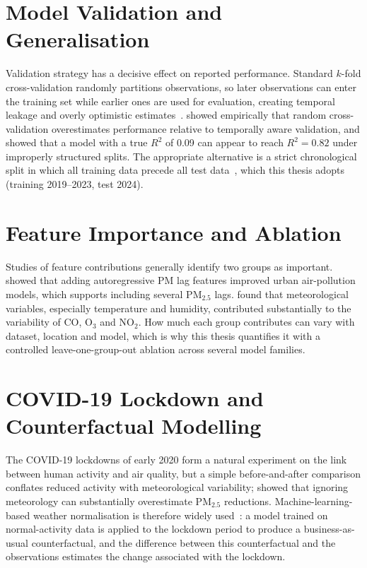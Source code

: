 \section{Model Validation and Generalisation}
Validation strategy has a decisive effect on reported performance. Standard $k$-fold cross-validation randomly partitions observations, so later observations can enter the training set while earlier ones are used for evaluation, creating temporal leakage and overly optimistic estimates~\parencite{mendez2023}. \textcite{xie2025} showed empirically that random cross-validation overestimates performance relative to temporally aware validation, and \textcite{boser2024} showed that a model with a true $R^2$ of 0.09 can appear to reach $R^2 = 0.82$ under improperly structured splits. The appropriate alternative is a strict chronological split in which all training data precede all test data~\parencite{bhatt2026}, which this thesis adopts (training 2019--2023, test 2024).

\section{Feature Importance and Ablation}
\label{sec:feature-importance}
Studies of feature contributions generally identify two groups as important. \textcite{zhalehdoost2025} showed that adding autoregressive PM lag features improved urban air-pollution models, which supports including several PM$_{2.5}$ lags. \textcite{rad2025} found that meteorological variables, especially temperature and humidity, contributed substantially to the variability of CO, O$_3$ and NO$_2$. How much each group contributes can vary with dataset, location and model, which is why this thesis quantifies it with a controlled leave-one-group-out ablation across several model families.

\section{COVID-19 Lockdown and Counterfactual Modelling}
\label{section:COVID-19 Lockdown and Counterfactual Modelling}
The COVID-19 lockdowns of early 2020 form a natural experiment on the link between human activity and air quality, but a simple before-and-after comparison conflates reduced activity with meteorological variability; \textcite{lv2022} showed that ignoring meteorology can substantially overestimate PM$_{2.5}$ reductions. Machine-learning-based weather normalisation is therefore widely used~\parencite{rybarczyk2021, shi2021, lovrić2020}: a model trained on normal-activity data is applied to the lockdown period to produce a business-as-usual counterfactual, and the difference between this counterfactual and the observations estimates the change associated with the lockdown.

